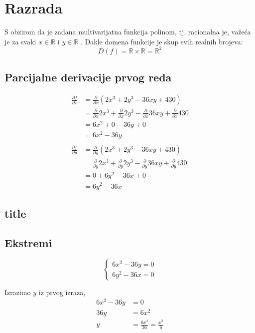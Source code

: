 \chapter{Razrada}

S obzirom da je zadana multivarijatna funkcija polinom, tj. racionalna je, važeća je za svaki $x \in \mathbb{R}$ i $y \in \mathbb{R}$ \cite[vidi][stranica 119]{kolegij}.
Dakle domena funkcije je skup svih realnih brojeva:
$$
    D(f) = \mathbb{R} \times \mathbb{R} = \mathbb{R}^2
$$

\section{Parcijalne derivacije prvog reda}

\begin{align*}
    \frac{\partial f}{\partial x} & = \frac{\partial}{\partial x} (2x^3 + 2y^3 - 36xy + 430) \\
    & = \frac{\partial}{\partial x} 2x^3 + \frac{\partial}{\partial x}2y^3 - \frac{\partial}{\partial x}36xy + \frac{\partial}{\partial x}430 \\
    & = 6x^2 + 0 - 36y + 0 \\
    & = 6x^2 - 36y \\
    \\
    \frac{\partial f}{\partial y} & = \frac{\partial}{\partial y} (2x^3 + 2y^3 - 36xy + 430) \\
    & = \frac{\partial}{\partial y} 2x^3 + \frac{\partial}{\partial y}2y^3 - \frac{\partial}{\partial y}36xy + \frac{\partial}{\partial y}430 \\
    & = 0 + 6y^2 - 36x + 0\\
    & = 6y^2 - 36x
\end{align*}

\section{title}

\section{Ekstremi}

$$
\begin{cases}
    6x^2 - 36y = 0 \\
    6y^2 - 36x = 0
\end{cases}
$$

Izrazimo $y$ iz prvog izraza,
\begin{align*}
    6x^2 - 36y &= 0 \\
    36y & = 6x^2 \\
    y & = \frac{6x^2}{36} = \frac{x^2}{6} \\
\end{align*}

